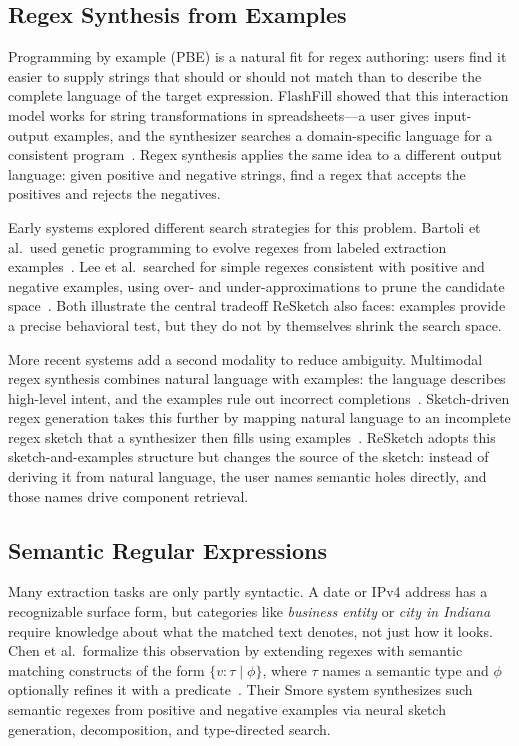 \documentclass[sigconf,nonacm]{acmart}
\begin{document}
\subsection{Regex Synthesis from Examples}
Programming by example (PBE) is a natural fit for regex authoring: users find
it easier to supply strings that should or should not match than to describe the
complete language of the target expression.
FlashFill showed that this interaction model works for string transformations
in spreadsheets---a user gives input-output examples, and the synthesizer
searches a domain-specific language for a consistent
program~\cite{gulwani2011automating}. Regex synthesis applies the same idea
to a different output language: given positive and negative strings, find a
regex that accepts the positives and rejects the negatives.

Early systems explored different search strategies for this problem.
Bartoli et al.\ used genetic programming to evolve regexes from labeled
extraction examples~\cite{bartoli2014automatic}.
Lee et al.\ searched for simple regexes consistent with positive and negative
examples, using over- and under-approximations to prune the candidate
space~\cite{lee2016synthesizing}.
Both illustrate the central tradeoff ReSketch also faces: examples provide a
precise behavioral test, but they do not by themselves shrink the search space.

More recent systems add a second modality to reduce ambiguity. Multimodal regex
synthesis combines natural language with examples: the language describes
high-level intent, and the examples rule out incorrect
completions~\cite{chen2020multimodal}. Sketch-driven regex generation takes
this further by mapping natural language to an incomplete regex sketch that a
synthesizer then fills using examples~\cite{ye2020sketch}.
ReSketch adopts this sketch-and-examples structure but changes the source of
the sketch: instead of deriving it from natural language, the user names
semantic holes directly, and those names drive component retrieval.

\subsection{Semantic Regular Expressions}
Many extraction tasks are only partly syntactic.
A date or IPv4 address has a recognizable surface form, but categories like
\emph{business entity} or \emph{city in Indiana} require knowledge about what
the matched text denotes, not just how it looks.
Chen et al.\ formalize this observation by extending regexes with semantic
matching constructs of the form \(\{v:\tau \mid \phi\}\), where \(\tau\) names
a semantic type and \(\phi\) optionally refines it with a
predicate~\cite{chen2023data}. Their Smore system synthesizes such semantic
regexes from positive and negative examples via neural sketch generation,
decomposition, and type-directed search.
\end{document}
